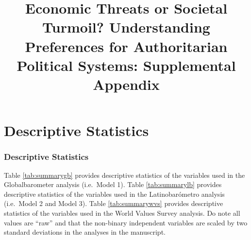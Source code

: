 \documentclass[11pt,]{article}
\title{Economic Threats or Societal Turmoil? Understanding Preferences for
Authoritarian Political Systems: Supplemental Appendix  }
\date{}
\begin{document}
	
%

{%
\setlength{\parindent}{0pt}
\thispagestyle{plain}
{\fontsize{18}{20}\selectfont\raggedright 
\maketitle  %

}

{
   \vskip 13.5pt\relax \normalsize\fontsize{11}{12} 
\hfill 

}

}






\vskip 6.5pt

{
\hypersetup{linkcolor=black}
\setcounter{tocdepth}{2}
\tableofcontents
}

\noindent \doublespacing \newpage

\hypertarget{descriptive-statistics}{%
\section{Descriptive Statistics}\label{descriptive-statistics}}

\hypertarget{descriptive-statistics-1}{%
\subsubsection{Descriptive Statistics}\label{descriptive-statistics-1}}

Table \ref{tab:summarygb} provides descriptive statistics of the
variables used in the Globalbarometer analysis (i.e.~Model 1). Table
\ref{tab:summarylb} provides descriptive statistics of the variables
used in the Latinobarómetro analysis (i.e.~Model 2 and Model 3). Table
\ref{tab:summarywvs} provides descriptive statistics of the variables
used in the World Values Survey analysis. Do note all values are ``raw''
and that the non-binary independent variables are scaled by two standard
deviations in the analyses in the manuscript.
\end{document}
